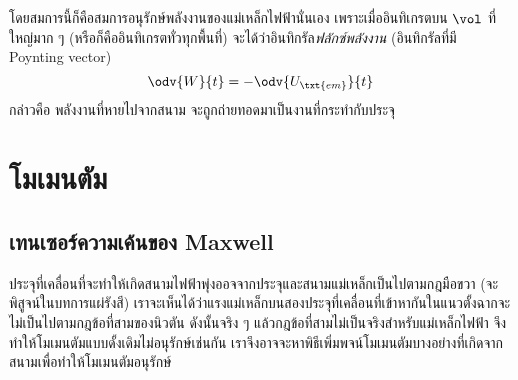 โดยสมการนี้ก็คือสมการอนุรักษ์พลังงานของแม่เหล็กไฟฟ้านั่นเอง เพราะเมื่ออินทิเกรตบน $\vol$ ที่ใหญ่มาก ๆ (หรือก็คืออินทิเกรตทั่วทุกพื้นที่) จะได้ว่าอินทิกรัล\emph{ฟลักซ์พลังงาน} (อินทิกรัลที่มี Poynting vector)
\begin{equation}
    \odv{W}{t} = -\odv{U_\txt{em}}{t}
\end{equation}
กล่าวคือ พลังงานที่หายไปจากสนาม จะถูกถ่ายทอดมาเป็นงานที่กระทำกับประจุ

\section{โมเมนตัม}

\subsection{เทนเซอร์ความเค้นของ Maxwell}

ประจุที่เคลื่อนที่จะทำให้เกิดสนามไฟฟ้าพุ่งออจจากประจุและสนามแม่เหล็กเป็นไปตามกฎมือขวา (จะพิสูจน์ในบทการแผ่รังสี) เราจะเห็นได้ว่าแรงแม่เหล็กบนสองประจุที่เคลื่อนที่เข้าหากันในแนวตั้งฉากจะไม่เป็นไปตามกฎข้อที่สามของนิวตัน ดังนั้นจริง ๆ แล้วกฎข้อที่สามไม่เป็นจริงสำหรับแม่เหล็กไฟฟ้า จึงทำให้โมเมนตัมแบบดั้งเดิมไม่อนุรักษ์เช่นกัน เราจึงอาจจะหาพิธีเพิ่มพจน์โมเมนตัมบางอย่างที่เกิดจากสนามเพื่อทำให้โมเมนตัมอนุรักษ์

